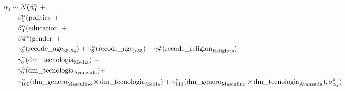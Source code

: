 \documentclass{article}
\begin{document}
\begin{equation}
    \begin{split}
    \MoveEqLeft
    \alpha_{j}  \sim N (\beta_{0}^{\alpha}\ + \\
    & \beta_{1}^{\alpha}(\operatorname{politics}\ + \\
    & \beta_{3}^{\alpha}(\operatorname{education}\ + \\
    & \beta{4}^{\alpha}(\operatorname{gender}\ + \\
    & \gamma_{5}^{\alpha}(\operatorname{recode\_age}_{\operatorname{35-54}}) + \gamma_{6}^{\alpha}(\operatorname{recode\_age}_{\operatorname{>55}}) + \gamma_{7}^{\alpha}(\operatorname{recode\_religion}_{\operatorname{Religious}})\ + \\
    & \gamma_{8}^{\alpha}(\operatorname{dm\_tecnologia}_{\operatorname{Media}})\ + \\
    & \gamma_{9}^{\alpha}(\operatorname{dm\_tecnologia}_{\operatorname{Avanzada}}) + \\
    & \gamma_{100}^{\alpha}(\operatorname{dm\_genero}_{\operatorname{Masculino}} \times \operatorname{dm\_tecnologia}_{\operatorname{Media}}) + \gamma_{111}^{\alpha}(\operatorname{dm\_genero}_{\operatorname{Masculino}} \times \operatorname{dm\_tecnologia}_{\operatorname{Avanzada}}), \sigma^2_{\alpha_{j}})
    \end{split}
\end{equation}
\end{document}
